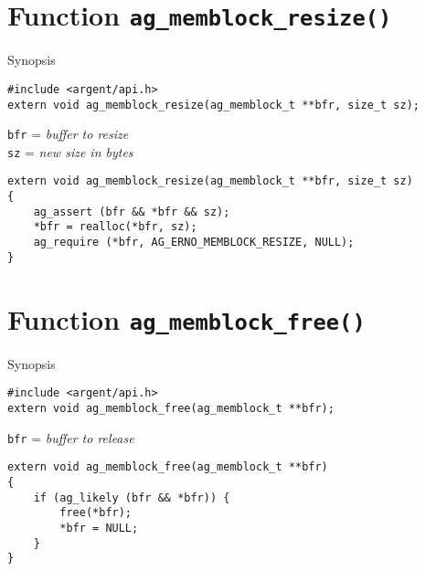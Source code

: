 %


\section{Function \texttt{ag\_memblock\_resize()}}
  \begin{bclogo}[logo=\bccrayon, noborder=true, barre=snake, couleurBarre=gray]
    {Synopsis}
  \lstset{style=SYNOPSIS}
  \begin{lstlisting}[linewidth=1.0\linewidth]
#include <argent/api.h>
extern void ag_memblock_resize(ag_memblock_t **bfr, size_t sz);
  \end{lstlisting}
  \scriptsize
  \texttt{bfr} = \emph{buffer to resize} \\
  \texttt{sz} = \emph{new size in bytes}
  \end{bclogo}

\lstset{style=CODE}
\begin{lstlisting}[linewidth=1.0\linewidth,
    caption=Definition of ag\_memblock\_resize()]
extern void ag_memblock_resize(ag_memblock_t **bfr, size_t sz)
{
    ag_assert (bfr && *bfr && sz);
    *bfr = realloc(*bfr, sz);
    ag_require (*bfr, AG_ERNO_MEMBLOCK_RESIZE, NULL);
}
\end{lstlisting}


%


\section{Function \texttt{ag\_memblock\_free()}}
  \begin{bclogo}[logo=\bccrayon, noborder=true, barre=snake, couleurBarre=gray]
    {Synopsis}
  \lstset{style=SYNOPSIS}
  \begin{lstlisting}[linewidth=1.0\linewidth]
#include <argent/api.h>
extern void ag_memblock_free(ag_memblock_t **bfr);
  \end{lstlisting}
  \scriptsize
  \texttt{bfr} = \emph{buffer to release} \\
  \end{bclogo}

\lstset{style=CODE}
\begin{lstlisting}[linewidth=1.0\linewidth,
    caption=Definition of ag\_memblock\_free()]
extern void ag_memblock_free(ag_memblock_t **bfr)
{
    if (ag_likely (bfr && *bfr)) {
        free(*bfr);
        *bfr = NULL;
    }
}

\end{lstlisting}

